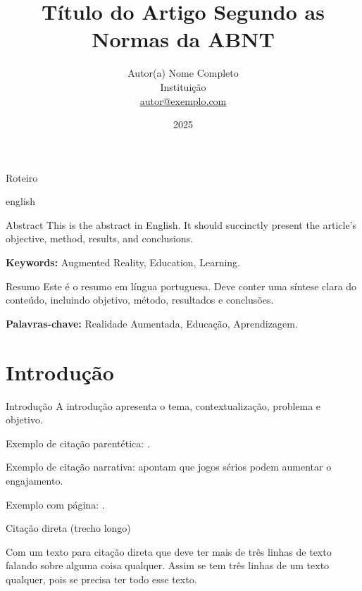 \documentclass[aspectratio=169]{beamer}
\title{Título do Artigo Segundo as Normas da ABNT}
\author{Autor(a) Nome Completo\\[2pt]\tiny Instituição\\ \href{mailto:autor@exemplo.com}{autor@exemplo.com}}
\date{2025}
\begin{document}
\begin{frame}
  \titlepage
\end{frame}

\begin{frame}{Roteiro}
  \tableofcontents
\end{frame}

\begin{otherlanguage*}{english}
\begin{frame}{Abstract}
This is the abstract in English. It should succinctly present the article’s
objective, method, results, and conclusions.

\medskip
\textbf{Keywords:} Augmented Reality, Education, Learning.
\end{frame}
\end{otherlanguage*}

\begin{frame}{Resumo}
Este é o resumo em língua portuguesa. Deve conter uma síntese clara do conteúdo,
incluindo objetivo, método, resultados e conclusões.

\medskip
\textbf{Palavras-chave:} Realidade Aumentada, Educação, Aprendizagem.
\end{frame}

\section{Introdução}

\begin{frame}{Introdução}
A introdução apresenta o tema, contextualização, problema e objetivo.

Exemplo de citação parentética: \parencite{albuquerqueToyUserInterfaces2021}.

Exemplo de citação narrativa: \textcite{aragaoEnsinoProgramacaoPensamento2023}
apontam que jogos sérios podem aumentar o engajamento.

Exemplo com página: \parencite[p.~25]{azumaRecentAdvancesAugmentedReality2001}.
\end{frame}

\begin{frame}{Citação direta (trecho longo)}
\small
\begin{displayquote}
Com um texto para citação direta que deve ter mais de três linhas de texto
falando sobre alguma coisa qualquer. Assim se tem três linhas de um texto
qualquer, pois se precisa ter todo esse texto.
\end{displayquote}
\end{frame}
\end{document}
